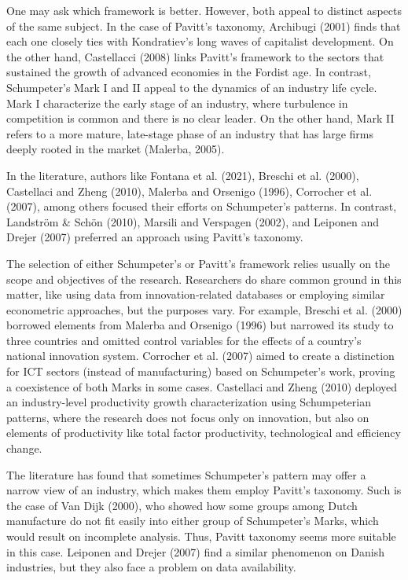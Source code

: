 \documentclass[12pt,a4paper]{article}
\begin{document}
One may ask which framework is better. However, both appeal to distinct aspects of the same subject. In the case of Pavitt’s taxonomy, Archibugi (2001) finds that each one closely ties with Kondratiev's long waves of capitalist development. On the other hand, Castellacci (2008) links Pavitt’s framework to the sectors that sustained the growth of advanced economies in the Fordist age. In contrast, Schumpeter's Mark I and II appeal to the dynamics of an industry life cycle. Mark I characterize the early stage of an industry, where turbulence in competition is common and there is no clear leader. On the other hand, Mark II refers to a more mature, late-stage phase of an industry that has large firms deeply rooted in the market (Malerba, 2005). 

In the literature, authors like Fontana et al. (2021), Breschi et al. (2000), Castellaci and Zheng (2010), Malerba and Orsenigo (1996), Corrocher et al. (2007), among others focused their efforts on Schumpeter's patterns. In contrast, Landström \& Schön (2010), Marsili and Verspagen (2002), and Leiponen and Drejer (2007) preferred an approach using Pavitt's taxonomy. 

The selection of either Schumpeter’s or Pavitt’s framework relies usually on the scope and objectives of the research. Researchers do share common ground in this matter, like using data from innovation-related databases or employing similar econometric approaches, but the purposes vary. For example, Breschi et al. (2000) borrowed elements from Malerba and Orsenigo (1996) but narrowed its study to three countries and omitted control variables for the effects of a country's national innovation system. Corrocher et al. (2007) aimed to create a distinction for ICT sectors (instead of manufacturing) based on Schumpeter’s work, proving a coexistence of both Marks in some cases. Castellaci and Zheng (2010) deployed an industry-level productivity growth characterization using Schumpeterian patterns, where the research does not focus only on innovation, but also on elements of productivity like total factor productivity, technological and efficiency change. 

The literature has found that sometimes Schumpeter’s pattern may offer a narrow view of an industry, which makes them employ Pavitt’s taxonomy. Such is the case of Van Dijk (2000), who showed how some groups among Dutch manufacture do not fit easily into either group of Schumpeter’s Marks, which would result on incomplete analysis. Thus, Pavitt taxonomy seems more suitable in this case. Leiponen and Drejer (2007) find a similar phenomenon on Danish industries, but they also face a problem on data availability. 
\end{document}
